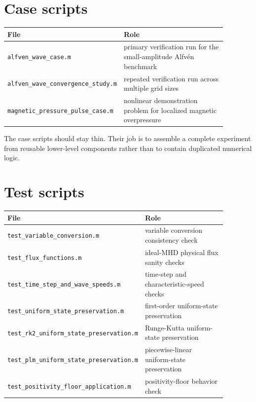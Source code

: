 \documentclass[11pt]{article}
\begin{document}
\section{Case scripts}
\begin{center}
\begin{tabular}{p{0.33\linewidth} p{0.55\linewidth}}
\toprule
\textbf{File} & \textbf{Role} \\
\midrule
\texttt{alfven\_wave\_case.m} & primary verification run for the small-amplitude Alfv\'en benchmark \\
\texttt{alfven\_wave\_convergence\_study.m} & repeated verification run across multiple grid sizes \\
\texttt{magnetic\_pressure\_pulse\_case.m} & nonlinear demonstration problem for localized magnetic overpressure \\
\bottomrule
\end{tabular}
\end{center}

The case scripts should stay thin. Their job is to assemble a complete experiment from reusable lower-level components rather than to contain duplicated numerical logic.

\section{Test scripts}
\begin{center}
\begin{tabular}{p{0.33\linewidth} p{0.55\linewidth}}
\toprule
\textbf{File} & \textbf{Role} \\
\midrule
\texttt{test\_variable\_conversion.m} & variable conversion consistency check \\
\texttt{test\_flux\_functions.m} & ideal-MHD physical flux sanity checks \\
\texttt{test\_time\_step\_and\_wave\_speeds.m} & time-step and characteristic-speed checks \\
\texttt{test\_uniform\_state\_preservation.m} & first-order uniform-state preservation \\
\texttt{test\_rk2\_uniform\_state\_preservation.m} & Runge-Kutta uniform-state preservation \\
\texttt{test\_plm\_uniform\_state\_preservation.m} & piecewise-linear uniform-state preservation \\
\texttt{test\_positivity\_floor\_application.m} & positivity-floor behavior check \\
\bottomrule
\end{tabular}
\end{center}
\end{document}
